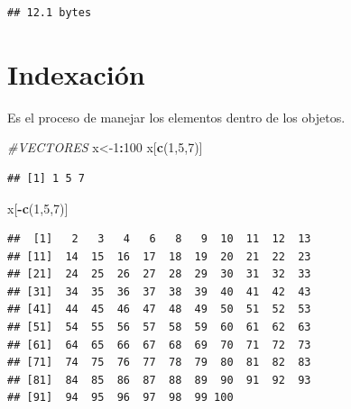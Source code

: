 \documentclass[
]{book}
\newenvironment{Shaded}{\begin{snugshade}}{\end{snugshade}}
\newcommand{\CommentTok}[1]{\textcolor[rgb]{0.56,0.35,0.01}{\textit{#1}}}
\newcommand{\DecValTok}[1]{\textcolor[rgb]{0.00,0.00,0.81}{#1}}
\newcommand{\KeywordTok}[1]{\textcolor[rgb]{0.13,0.29,0.53}{\textbf{#1}}}
\newcommand{\NormalTok}[1]{#1}
\newcommand{\OperatorTok}[1]{\textcolor[rgb]{0.81,0.36,0.00}{\textbf{#1}}}
\newcommand{\StringTok}[1]{\textcolor[rgb]{0.31,0.60,0.02}{#1}}
\begin{document}
\begin{verbatim}
## 12.1 bytes
\end{verbatim}

\hypertarget{indexaciuxf3n}{%
\section{Indexación}\label{indexaciuxf3n}}

Es el proceso de manejar los elementos dentro de los objetos.

\begin{Shaded}
\begin{Highlighting}[]
\CommentTok{#VECTORES}
\NormalTok{x<-}\DecValTok{1}\OperatorTok{:}\DecValTok{100}
\NormalTok{x[}\KeywordTok{c}\NormalTok{(}\DecValTok{1}\NormalTok{,}\DecValTok{5}\NormalTok{,}\DecValTok{7}\NormalTok{)]}
\end{Highlighting}
\end{Shaded}

\begin{verbatim}
## [1] 1 5 7
\end{verbatim}

\begin{Shaded}
\begin{Highlighting}[]
\NormalTok{x[}\OperatorTok{-}\KeywordTok{c}\NormalTok{(}\DecValTok{1}\NormalTok{,}\DecValTok{5}\NormalTok{,}\DecValTok{7}\NormalTok{)]}
\end{Highlighting}
\end{Shaded}

\begin{verbatim}
##  [1]   2   3   4   6   8   9  10  11  12  13
## [11]  14  15  16  17  18  19  20  21  22  23
## [21]  24  25  26  27  28  29  30  31  32  33
## [31]  34  35  36  37  38  39  40  41  42  43
## [41]  44  45  46  47  48  49  50  51  52  53
## [51]  54  55  56  57  58  59  60  61  62  63
## [61]  64  65  66  67  68  69  70  71  72  73
## [71]  74  75  76  77  78  79  80  81  82  83
## [81]  84  85  86  87  88  89  90  91  92  93
## [91]  94  95  96  97  98  99 100
\end{verbatim}

\begin{Shaded}
\end{Shaded}
\end{document}
